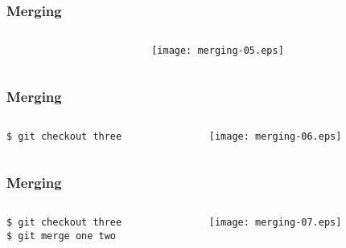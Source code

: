 \documentclass[english]{beamer}
\newcommand{\CMD}[1]{%
\texttt{\textcolor{code-green}{#1}}%
}
\newcommand{\cmd}[1]{%
\texttt{\textcolor{code-orange}{#1}}%
}
\begin{document}
\begin{frame}
\frametitle{Merging}

\begin{columns}[t]
        \begin{column}[T]{.5\textwidth}
        \end{column}
        \begin{column}[T]{.5\textwidth}
                \texttt{[image: merging-05.eps]}
        \end{column}
\end{columns}
\end{frame}

\begin{frame}
\frametitle{Merging}

\begin{columns}[t]
        \begin{column}[T]{.5\textwidth}
                {\small
                \CMD{\$ git checkout three} \\
                }
        \end{column}
        \begin{column}[T]{.5\textwidth}
                \texttt{[image: merging-06.eps]}
        \end{column}
\end{columns}
\end{frame}

\begin{frame}
\frametitle{Merging}

\begin{columns}[t]
        \begin{column}[T]{.5\textwidth}
                {\small
                \cmd{\$ git checkout three} \\
                \CMD{\$ git merge one two} \\
                }
        \end{column}
        \begin{column}[T]{.5\textwidth}
                \texttt{[image: merging-07.eps]}
        \end{column}
\end{columns}
\end{frame}
\end{document}

